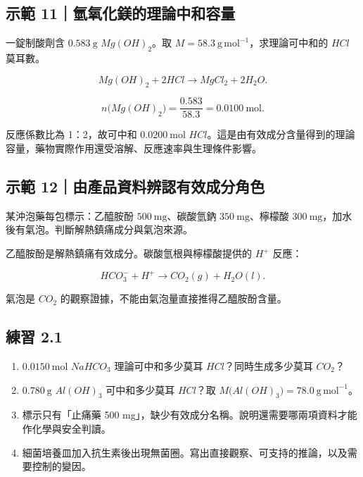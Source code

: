 \documentclass[11pt,a4paper]{article}
\providecommand{\tightlist}{%
  \setlength{\itemsep}{0pt}\setlength{\parskip}{0pt}}
\begin{document}
\begin{HandoutWorkedExample}

\subsection{示範 11｜氫氧化鎂的理論中和容量}\label{ux793aux7bc4-11ux6c2bux6c27ux5316ux9382ux7684ux7406ux8ad6ux4e2dux548cux5bb9ux91cf}

一錠制酸劑含 \(0.583\ \mathrm g\) \(Mg(OH)_2\)。取 \(M=58.3\ \mathrm{g\,mol^{-1}}\)，求理論可中和的 \(HCl\) 莫耳數。

\[
Mg(OH)_2+2HCl\rightarrow MgCl_2+2H_2O.
\]

\[
n\bigl(Mg(OH)_2\bigr)=\frac{0.583}{58.3}=0.0100\ \mathrm{mol}.
\]

反應係數比為 1：2，故可中和 \(0.0200\ \mathrm{mol}\) \(HCl\)。這是由有效成分含量得到的理論容量，藥物實際作用還受溶解、反應速率與生理條件影響。

\end{HandoutWorkedExample}

\begin{HandoutWorkedExample}

\subsection{示範 12｜由產品資料辨認有效成分角色}\label{ux793aux7bc4-12ux7531ux7522ux54c1ux8cc7ux6599ux8fa8ux8a8dux6709ux6548ux6210ux5206ux89d2ux8272}

某沖泡藥每包標示：乙醯胺酚 \(500\ \mathrm{mg}\)、碳酸氫鈉 \(350\ \mathrm{mg}\)、檸檬酸 \(300\ \mathrm{mg}\)，加水後有氣泡。判斷解熱鎮痛成分與氣泡來源。

乙醯胺酚是解熱鎮痛有效成分。碳酸氫根與檸檬酸提供的 \(H^+\) 反應：

\[
HCO_3^-+H^+\rightarrow CO_2(g)+H_2O(l).
\]

氣泡是 \(CO_2\) 的觀察證據，不能由氣泡量直接推得乙醯胺酚含量。

\end{HandoutWorkedExample}

\subsection{練習 2.1}\label{ux7df4ux7fd2-2.1}

\begin{enumerate}
\def\labelenumi{\arabic{enumi}.}
\tightlist
\item
  \(0.0150\ \mathrm{mol}\) \(NaHCO_3\) 理論可中和多少莫耳 \(HCl\)？同時生成多少莫耳 \(CO_2\)？
\item
  \(0.780\ \mathrm g\) \(Al(OH)_3\) 可中和多少莫耳 \(HCl\)？取 \(M\bigl(Al(OH)_3\bigr)=78.0\ \mathrm{g\,mol^{-1}}\)。
\item
  標示只有「止痛藥 500 mg」，缺少有效成分名稱。說明還需要哪兩項資料才能作化學與安全判讀。
\item
  細菌培養皿加入抗生素後出現無菌圈。寫出直接觀察、可支持的推論，以及需要控制的變因。
\end{enumerate}
\end{document}
